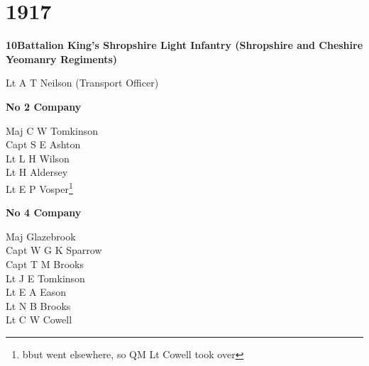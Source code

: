 \chapter*{1917}

\vspace*{10mm}

\begin{center}
  \Large
  \textbf{10\nth Battalion King's Shropshire Light Infantry (Shropshire and Cheshire \\ Yeomanry Regiments)}
\end{center}

\begin{multicols}{2}
  \noindent
  Lt A T Neilson (Transport Officer) \\
\end{multicols}

\vspace*{10mm}

\begin{center}
  \Large
  \textbf{No 2 Company}
\end{center}

\begin{multicols}{2}
  \noindent
  Maj C W Tomkinson \\
  Capt S E Ashton \\
  Lt L H Wilson \\
  Lt H Aldersey \\
  Lt E P Vosper\footnote{bbut went elsewhere, so QM Lt Cowell took over} \\
\end{multicols}

\vspace*{10mm}

\begin{center}
  \Large
  \textbf{No 4 Company}
\end{center}

\begin{multicols}{2}
  \noindent
  Maj Glazebrook \\
  Capt W G K Sparrow \\
  Capt T M Brooks \\
  Lt J E Tomkinson \\
  Lt E A Eason \\
  Lt N B Brooks \\
  Lt C W Cowell \\
\end{multicols}

